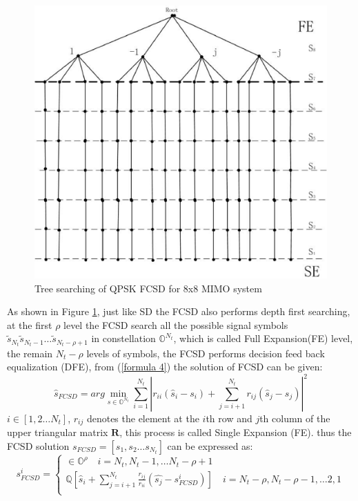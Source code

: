 \documentclass[12pt,a4paper,final]{article}
\begin{document}
\begin{spacing}{2.5}
\begin{figure}[tb]
\includegraphics[scale=0.5]{FCSD_tree_searching.eps}
\caption{Tree searching of QPSK FCSD for 8x8 MIMO system}
\label{figure4}
\end{figure}
As shown in Figure \ref{figure4}, just like SD the FCSD also performs depth first searching, at the first $\rho$ level the FCSD search all the possible signal symbols $\widetilde{s}_{N_{t}} \widetilde{s}_{N_{t}-1}\dots \widetilde{s}_{N_{t}-\rho+1}$ in constellation $\mathbb{O}^{N_{t}}$, which is called Full Expansion(FE) level, the remain $N_{t}-\rho$ levels of symbols, the FCSD performs decision feed back equalization (DFE), from (\ref{formula 4}) the solution of FCSD can be given:
\begin{equation}
\hat{s}_{FCSD}=arg\min_{s\in \mathbb{O}^{N_{t}}}\sum_{i=1}^{N_{t}}|r_{ii}(\hat{s}_{i}-s_{i})+\sum_{j=i+1}^{N_{t}}r_{ij}(\hat{s}_{j}-s_{j})|^{2}  \label{formula 5}
\end{equation} 
$i\in [1,2\dots N_{t}]$, $r_{ij}$ denotes the element at the $i$th row and $j$th column of the upper triangular matrix $\mathbf{R}$, this process is called Single Expansion (FE).
thus the FCSD solution $s_{FCSD}=[s_{1},s_{2}\dots s_{N_{t}}]$ can be expressed as:
\begin{displaymath}
s_{FCSD}^{i}=\left\lbrace\begin{array}{c}
\in \mathbb{O}^{\rho}      \quad i=N_{t},N_{t}-1,\dots N_{t}-\rho+1\\
\mathbb{Q}[\hat{s}_{i}+\sum_{j=i+1}^{N_{t}}\frac{r_{ij}}{r_{ii}}(\hat{s_{j}}-s_{FCSD}^{i})] \quad i=N_{t}-\rho,N_{t}-\rho-1,\dots 2,1 \\

\end{array}
\end{displaymath}
\end{spacing}
\end{document}
